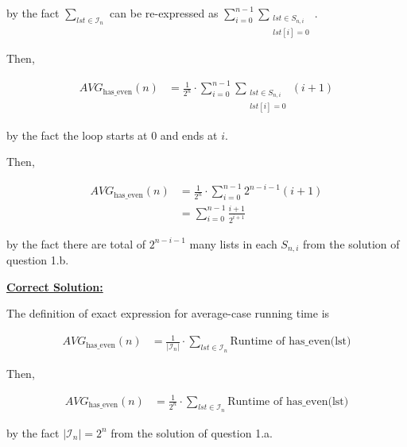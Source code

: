 \documentclass[12pt]{article}
\begin{document}
\begin{enumerate}[a.]
    by the fact $\sum\limits_{lst \in \mathcal{I}_n}$ can be re-expressed as $\sum\limits_{i=0}^{n-1} \sum\limits_{\substack{lst \in S_{n,i}\\ lst[i]=0}}$.

    \bigskip

    Then,

    \begin{align}
        AVG_{\text{has\_even}}(n) &= \frac{1}{2^n} \cdot \sum\limits_{i=0}^{n-1} \sum\limits_{\substack{lst \in S_{n,i}\\ lst[i]=0}} (i+1)
    \end{align}

    by the fact the loop starts at $0$ and ends at $i$.

    \bigskip

    Then,

    \begin{align}
        AVG_{\text{has\_even}}(n) &= \frac{1}{2^n} \cdot \sum\limits_{i=0}^{n-1} 2^{n-i-1} (i+1)\\
        &= \sum\limits_{i=0}^{n-1} \frac{i+1}{2^{i+1}}
    \end{align}

    by the fact there are total of $2^{n-i-1}$ many lists in each $S_{n,i}$ from
    the solution of question 1.b.

    \bigskip

    \begin{mdframed}
        \underline{\textbf{Correct Solution:}}

        \bigskip

        The definition of exact expression for average-case running time is

        \setcounter{equation}{0}
        \begin{align}
            AVG_{\text{has\_even}}(n) &= \frac{1}{\lvert \mathcal{I}_n \rvert} \cdot \sum\limits_{lst \in \mathcal{I}_n} \text{Runtime of has\_even(lst)}
        \end{align}

        \bigskip

        Then,

        \begin{align}
            AVG_{\text{has\_even}}(n) &= \frac{1}{2^n} \cdot \sum\limits_{lst \in \mathcal{I}_n} \text{Runtime of has\_even(lst)}
        \end{align}

        by the fact $\lvert \mathcal{I}_n \rvert = 2^n$ from the solution of question 1.a.


\end{mdframed}
\end{enumerate}
\end{document}
